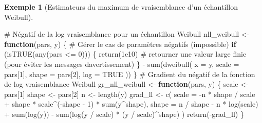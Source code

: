 \documentclass[
  11pt,
  letterpaper,
]{scrbook}
\newenvironment{Shaded}{\begin{snugshade}}{\end{snugshade}}
\newcommand{\AttributeTok}[1]{\textcolor[rgb]{0.40,0.45,0.13}{#1}}
\newcommand{\CommentTok}[1]{\textcolor[rgb]{0.37,0.37,0.37}{#1}}
\newcommand{\ConstantTok}[1]{\textcolor[rgb]{0.56,0.35,0.01}{#1}}
\newcommand{\ControlFlowTok}[1]{\textcolor[rgb]{0.00,0.23,0.31}{\textbf{#1}}}
\newcommand{\DecValTok}[1]{\textcolor[rgb]{0.68,0.00,0.00}{#1}}
\newcommand{\FloatTok}[1]{\textcolor[rgb]{0.68,0.00,0.00}{#1}}
\newcommand{\FunctionTok}[1]{\textcolor[rgb]{0.28,0.35,0.67}{#1}}
\newcommand{\NormalTok}[1]{\textcolor[rgb]{0.00,0.23,0.31}{#1}}
\newcommand{\OtherTok}[1]{\textcolor[rgb]{0.00,0.23,0.31}{#1}}
\newcommand{\SpecialCharTok}[1]{\textcolor[rgb]{0.37,0.37,0.37}{#1}}
\theoremstyle{plain}
\theoremstyle{definition}
\newtheorem{example}{Exemple}[chapter]
\theoremstyle{plain}
\theoremstyle{definition}
\theoremstyle{remark}
\begin{document}
\begin{example}[Estimateurs du maximum de vraisemblance d'un échantillon
Weibull]
\begin{Shaded}
\begin{Highlighting}[]
\CommentTok{\# Négatif de la log vraisemblance pour un échantillon Weibull}
\NormalTok{nll\_weibull }\OtherTok{\textless{}{-}} \ControlFlowTok{function}\NormalTok{(pars, y) \{}
  \CommentTok{\# Gérer le cas de paramètres négatifs (impossible)}
  \ControlFlowTok{if}\NormalTok{ (}\FunctionTok{isTRUE}\NormalTok{(}\FunctionTok{any}\NormalTok{(pars }\SpecialCharTok{\textless{}=} \DecValTok{0}\NormalTok{))) \{}
    \FunctionTok{return}\NormalTok{(}\FloatTok{1e10}\NormalTok{) }\CommentTok{\# retourner une valeur large finie (pour éviter les messages d\textquotesingle{}avertissement)}
\NormalTok{  \}}
  \SpecialCharTok{{-}} \FunctionTok{sum}\NormalTok{(}\FunctionTok{dweibull}\NormalTok{(}
    \AttributeTok{x =}\NormalTok{ y,}
    \AttributeTok{scale =}\NormalTok{ pars[}\DecValTok{1}\NormalTok{],}
    \AttributeTok{shape =}\NormalTok{ pars[}\DecValTok{2}\NormalTok{],}
    \AttributeTok{log =} \ConstantTok{TRUE}
\NormalTok{  ))}
\NormalTok{\}}
\CommentTok{\# Gradient du négatif de la fonction de log vraisemblance Weibull}
\NormalTok{gr\_nll\_weibull }\OtherTok{\textless{}{-}} \ControlFlowTok{function}\NormalTok{(pars, y) \{}
\NormalTok{  scale }\OtherTok{\textless{}{-}}\NormalTok{ pars[}\DecValTok{1}\NormalTok{]}
\NormalTok{  shape }\OtherTok{\textless{}{-}}\NormalTok{ pars[}\DecValTok{2}\NormalTok{]}
\NormalTok{  n }\OtherTok{\textless{}{-}} \FunctionTok{length}\NormalTok{(y)}
\NormalTok{  grad\_ll }\OtherTok{\textless{}{-}} \FunctionTok{c}\NormalTok{(}
    \AttributeTok{scale =} \SpecialCharTok{{-}}\NormalTok{n }\SpecialCharTok{*}\NormalTok{ shape }\SpecialCharTok{/}\NormalTok{ scale }\SpecialCharTok{+}\NormalTok{ shape }\SpecialCharTok{*}\NormalTok{ scale}\SpecialCharTok{\^{}}\NormalTok{(}\SpecialCharTok{{-}}\NormalTok{shape }\SpecialCharTok{{-}} \DecValTok{1}\NormalTok{) }\SpecialCharTok{*} \FunctionTok{sum}\NormalTok{(y}\SpecialCharTok{\^{}}\NormalTok{shape),}
    \AttributeTok{shape =}\NormalTok{ n }\SpecialCharTok{/}\NormalTok{ shape }\SpecialCharTok{{-}}\NormalTok{ n }\SpecialCharTok{*} \FunctionTok{log}\NormalTok{(scale) }\SpecialCharTok{+} \FunctionTok{sum}\NormalTok{(}\FunctionTok{log}\NormalTok{(y)) }\SpecialCharTok{{-}}
      \FunctionTok{sum}\NormalTok{(}\FunctionTok{log}\NormalTok{(y }\SpecialCharTok{/}\NormalTok{ scale) }\SpecialCharTok{*}\NormalTok{ (y }\SpecialCharTok{/}\NormalTok{ scale)}\SpecialCharTok{\^{}}\NormalTok{shape)}
\NormalTok{  )}
  \FunctionTok{return}\NormalTok{(}\SpecialCharTok{{-}}\NormalTok{grad\_ll)}
\NormalTok{\}}


\end{Highlighting}
\end{Shaded}
\end{example}
\end{document}
